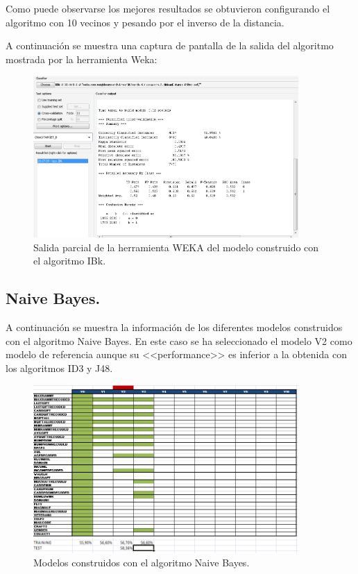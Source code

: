Como puede observarse los mejores resultados se obtuvieron configurando el algoritmo con 10 vecinos y pesando por el inverso de la distancia.

A continuación se muestra una captura de pantalla de la salida del algoritmo mostrada por la herramienta Weka:

\begin{figure}[H]
\begin{center}
\includegraphics[width=0.9\textwidth]{img/ibk-1}
\caption{Salida parcial de la herramienta WEKA del modelo construido con el algoritmo IBk.}
\end{center}
\end{figure}

\subsection{Naive Bayes.}

A continuación se muestra la información de los diferentes modelos construidos con el algoritmo Naive Bayes. En este caso se ha seleccionado el modelo V2 como modelo de referencia aunque su <<performance>> es inferior a la obtenida con los algoritmos ID3 y J48.

\begin{figure}[H]
\begin{center}
\includegraphics[width=0.9\textwidth]{img/nb-1}
\caption{Modelos construidos con el algoritmo Naive Bayes.}
\end{center}
\end{figure}

